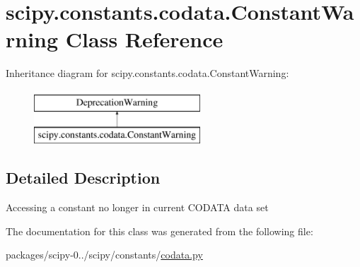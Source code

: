 \hypertarget{classscipy_1_1constants_1_1codata_1_1ConstantWarning}{}\section{scipy.\+constants.\+codata.\+Constant\+Warning Class Reference}
\label{classscipy_1_1constants_1_1codata_1_1ConstantWarning}
Inheritance diagram for scipy.\+constants.\+codata.\+Constant\+Warning\+:\begin{figure}[H]
\begin{center}
\leavevmode
\includegraphics[height=2.000000cm]{classscipy_1_1constants_1_1codata_1_1ConstantWarning}
\end{center}
\end{figure}


\subsection{Detailed Description}
\begin{DoxyVerb}Accessing a constant no longer in current CODATA data set\end{DoxyVerb}
 

The documentation for this class was generated from the following file\+:\begin{DoxyCompactItemize}
\item 
packages/scipy-\/0../scipy/constants/\hyperlink{codata_8py}{codata.\+py}\end{DoxyCompactItemize}
